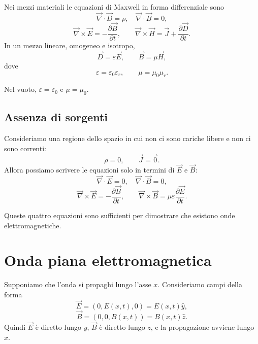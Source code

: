 \documentclass[a4paper]{article}
\begin{document}
Nei mezzi materiali le equazioni di Maxwell in forma differenziale sono
\[
\vec{\nabla}\cdot\vec{D}=\rho,
\quad
\vec{\nabla}\cdot\vec{B}=0,
\]
\[
\vec{\nabla}\times\vec{E}=-\frac{\partial\vec{B}}{\partial t},
\qquad
\vec{\nabla}\times\vec{H}=\vec{J}+\frac{\partial\vec{D}}{\partial t}.
\]
In un mezzo lineare, omogeneo e isotropo,
\[
\vec{D}=\varepsilon\vec{E},
\qquad
\vec{B}=\mu\vec{H},
\]
dove
\[
\varepsilon=\varepsilon_0\varepsilon_r,
\qquad
\mu=\mu_0\mu_r.
\]

Nel vuoto, \(\varepsilon=\varepsilon_0\) e \(\mu=\mu_0\).

\subsection{Assenza di sorgenti}

Consideriamo una regione dello spazio in cui non ci sono cariche libere e non ci sono correnti:
\[
\rho=0,
\qquad
\vec{J}=\vec{0}.
\]
Allora possiamo scrivere le equazioni solo in termini di \(\vec{E}\) e \(\vec{B}\):
\[
\vec{\nabla}\cdot\vec{E}=0,
\quad
\vec{\nabla}\cdot\vec{B}=0,
\]
\[
\vec{\nabla}\times\vec{E}=-\frac{\partial\vec{B}}{\partial t},
\qquad
\vec{\nabla}\times\vec{B}=\mu\varepsilon\frac{\partial\vec{E}}{\partial t}.
\]

Queste quattro equazioni sono sufficienti per dimostrare che esistono onde elettromagnetiche.

\section{Onda piana elettromagnetica}

Supponiamo che l'onda si propaghi lungo l'asse \(x\). Consideriamo campi della forma
\[
\vec{E}=(0,E(x,t),0)=E(x,t)\hat{y},
\]
\[
\vec{B}=(0,0,B(x,t))=B(x,t)\hat{z}.
\]
Quindi \(\vec{E}\) è diretto lungo \(y\), \(\vec{B}\) è diretto lungo \(z\), e la propagazione avviene lungo \(x\).

\begin{center}
\end{center}
\end{document}
